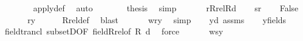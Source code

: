 \begin{isabellebody}
\ \ \ \ \ \ \isamarkupfalse%
\ apply{\isacharunderscore}{\kern0pt}def\ \isamarkupfalse%
\ auto\isanewline
\ \ \ \ \isamarkupfalse%
\ \isamarkupfalse%
\ {\isacharquery}{\kern0pt}thesis\ \isamarkupfalse%
\ simp\isanewline
\ \ \isamarkupfalse%
\isanewline
{}\isamarkupfalse%
\isanewline
\ \ \isamarkupfalse%
\ {\isacharquery}{\kern0pt}r{\isacharequal}{\kern0pt}{\isachardoublequoteopen}Rrel{\isacharparenleft}{\kern0pt}R{\isacharcomma}{\kern0pt}d{\isacharparenright}{\kern0pt}{\isachardoublequoteclose}\isanewline
\ \ \isamarkupfalse%
\ {\isacharquery}{\kern0pt}s{\isacharequal}{\kern0pt}{\isachardoublequoteopen}{\isacharquery}{\kern0pt}r{\isacharcircum}{\kern0pt}{\isacharplus}{\kern0pt}{\isachardoublequoteclose}\isanewline
\ \ \isamarkupfalse%
\ False\isanewline
\ \ \isamarkupfalse%
\isanewline
\ \ \isamarkupfalse%
\ {\isachardoublequoteopen}{\isacharquery}{\kern0pt}r{\isacharminus}{\kern0pt}{\isacharbackquote}{\kern0pt}{\isacharbackquote}{\kern0pt}{\isacharbraceleft}{\kern0pt}y{\isacharbraceright}{\kern0pt}{\isacharequal}{\kern0pt}{}{\isachardoublequoteclose}\isanewline
\ \ \ \ \isamarkupfalse%
\ Rrel{\isacharunderscore}{\kern0pt}def\ \isamarkupfalse%
\ blast\isanewline
\ \ \isamarkupfalse%
\isanewline
\ \ \isamarkupfalse%
\ {\isachardoublequoteopen}w{\isasymnotin}{\isacharquery}{\kern0pt}r{\isacharminus}{\kern0pt}{\isacharbackquote}{\kern0pt}{\isacharbackquote}{\kern0pt}{\isacharbraceleft}{\kern0pt}y{\isacharbraceright}{\kern0pt}{\isachardoublequoteclose}\ \isamarkupfalse%
\ simp\isanewline
\ \ \isamarkupfalse%
\ {\isacartoucheopen}y{\isasymnotin}d{\isacartoucheclose}\ assms\isanewline
\ \ \isamarkupfalse%
\ {\isachardoublequoteopen}y{\isasymnotin}field{\isacharparenleft}{\kern0pt}{\isacharquery}{\kern0pt}s{\isacharparenright}{\kern0pt}{\isachardoublequoteclose}\isanewline
\ \ \ \ \isamarkupfalse%
\ field{\isacharunderscore}{\kern0pt}trancl\ subsetD{\isacharbrackleft}{\kern0pt}OF\ field{\isacharunderscore}{\kern0pt}Rrel{\isacharbrackleft}{\kern0pt}of\ R\ d{\isacharbrackright}{\kern0pt}{\isacharbrackright}{\kern0pt}\ \isamarkupfalse%
\ force\isanewline
\ \ \isamarkupfalse%
\isanewline
\ \ \isamarkupfalse%
\ {\isachardoublequoteopen}w{\isasymnotin}{\isacharquery}{\kern0pt}s{\isacharminus}{\kern0pt}{\isacharbackquote}{\kern0pt}{\isacharbackquote}{\kern0pt}{\isacharbraceleft}{\kern0pt}y{\isacharbraceright}{\kern0pt}{\isachardoublequoteclose}\isanewline

\end{isabellebody}
